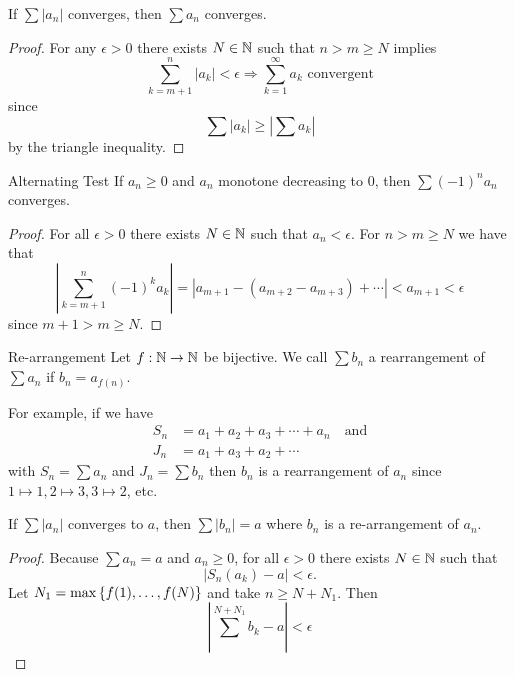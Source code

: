 \begin{thm}{}
    If $\sum |a_n|$ converges, then $\sum a_n$ converges.
    \begin{proof}
        For any $\epsilon > 0$ there exists $N \in \mathbb N$ such that $n > m \geq N$ implies 
        \[
            \sum_{k=m+1}^{n} |a_k| < \epsilon \Rightarrow \sum_{k=1}^{\infty} a_k \text{ convergent}
        \] 
        since 
        \[
            \sum |a_k| \geq \left|\sum a_k\right| 
        \]
        by the triangle inequality.
    \end{proof}
\end{thm}

\begin{thm}{Alternating Test}
    If $a_n \geq 0$ and $a_n$ monotone decreasing to $0$, then $\sum (-1)^n a_n$ converges. 
    \begin{proof}
        For all $\epsilon > 0$ there exists $N \in \mathbb N$ such that $a_n < \epsilon$. For $n > m \geq N$ we have that 
        \[
            \left|\sum_{k=m+1}^{n} (-1)^k a_k\right| = |a_{m+1} - (a_{m+2} - a_{m+3}) + \cdots | < a_{m+1} < \epsilon
        \]
        since $m + 1 > m \geq N$.
    \end{proof}
\end{thm}

\begin{defbox}{Re-arrangement}{}{}
    Let $f: \mathbb N \to \mathbb N$ be bijective. We call $\sum b_n$ a rearrangement of $\sum a_n$ if $b_n = a_{f(n)}$.
\end{defbox}

For example, if we have 
\begin{align*}
    S_n &= a_1 + a_2 + a_3 + \cdots + a_n \quad \text{and} \\
    J_n &= a_1 + a_3 + a_2 + \cdots 
\end{align*}
with $S_n = \sum a_n$ and $J_n = \sum b_n$ then $b_n$ is a rearrangement of $a_n$ since $1 \mapsto 1, 2 \mapsto 3, 3 \mapsto 2$, etc.

\begin{thm}{}
    If $\sum |a_n|$ converges to $a$, then $\sum |b_n| = a$ where $b_n$ is a re-arrangement of $a_n$.
    \begin{proof}
        Because $\sum a_n = a$ and $a_n \geq 0$, for all $\epsilon > 0$ there exists $N \in \mathbb N$ such that 
        \[
            |S_n(a_k) - a| < \epsilon.
        \]
        Let $N_1 = \max\left\{f(1), \ldots, f(N) \right\}$ and take $n \geq N + N_1$. Then 
        \[\left|\sum^{N+N_1} b_k - a\right| < \epsilon\]
    \end{proof}
\end{thm}